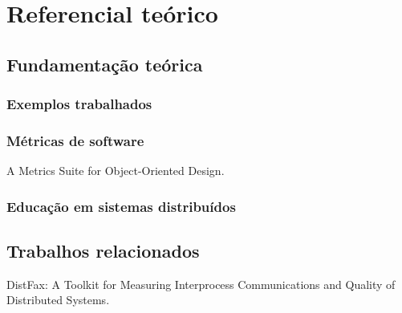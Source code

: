 \chapter{Referencial teórico}
\label{cap:referencialTeorico}


\section{Fundamentação teórica}
\label{section:background}


\subsection{Exemplos trabalhados}


\subsection{Métricas de software}

A Metrics Suite for Object-Oriented Design.


\subsection{Educação em sistemas distribuídos}



\section{Trabalhos relacionados}
\label{section:related-work}

DistFax: A Toolkit for Measuring Interprocess Communications and Quality of Distributed Systems.
    
